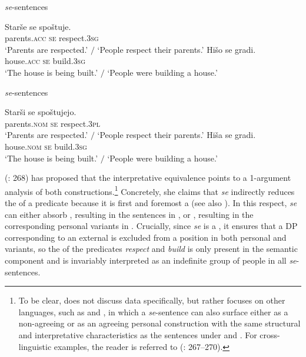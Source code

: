 \documentclass[output=paper,nonflat,newtxmath]{langsci/langscibook}
\begin{document}
\begin{exe}
 \textit{se}-{sentences}  \label{ex:lenardic: 2}
\begin{xlist}
\ex \gll Starše se spoštuje.\\
parents.\textsc{acc} \textsc{se} respect.\textsc{3sg}\\
\trans `Parents are respected.' $/$ `People respect their parents.'
\ex \gll Hišo se gradi.\\
house.\textsc{acc} \textsc{se} build.\textsc{3sg}\\
\trans `The house is being built.' $/$ `People were building a house.'
\end{xlist}
 \textit{se}-{sentences} \label{ex:lenardic: 3}
\begin{xlist}
\ex \gll Starši se spoštujejo.\\
parents.\textsc{nom} \textsc{se} respect.\textsc{3pl}\\
\trans `Parents are respected.' $/$ `People respect their parents.'
\ex \gll Hiša se gradi.\\
house.\textsc{nom} \textsc{se} build.\textsc{3sg}\\
\trans `The house is being built.' $/$ `People were building a house.'
\end{xlist}
\end{exe}


\newpage
\noindent \citeauthor{marelj2004} (\citeyear{marelj2004}: 268) has proposed that the interpretative equivalence points to a 1-argument analysis of both constructions.\footnote{To be clear, \citet{marelj2004} does not discuss  data specifically, but rather focuses on other  languages, such as  and , in which a \textit{se}-sentence can also surface either as a non-agreeing  or as an agreeing personal construction with the same structural and interpretative characteristics as the  sentences under  and . For cross-linguistic examples, the reader is referred to \citeauthor{marelj2004} (\citeyear{marelj2004}: 267--270).} Concretely, she claims that \textit{se} indirectly reduces the  of a predicate because it is first and foremost a  (see also \citealt{givon1998,franks1995}). In this respect, \textit{se} can either absorb , resulting in the  sentences in , or , resulting in the corresponding personal variants in . Crucially, since \textit{se} is a , it ensures that a DP corresponding to an external  is excluded from a  position in both personal and  variants, so the  of the predicates \textit{respect} and \textit{build}  is only present in the semantic component and is invariably interpreted as an indefinite group of people in all \textit{se}-sentences.
\end{document}
